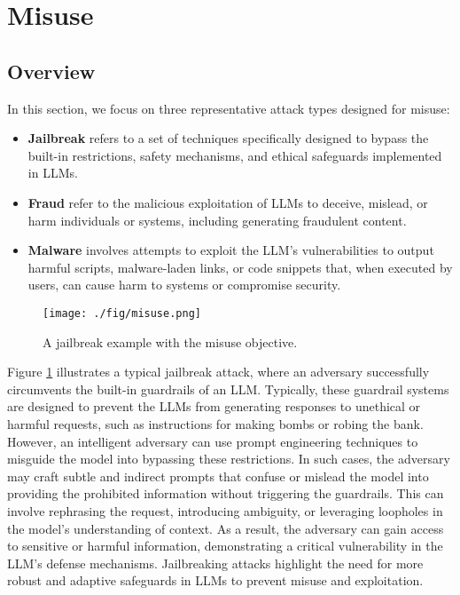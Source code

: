 \section{Misuse} \label{sec:misuse}
\subsection{Overview}

In this section, we focus on three representative attack types designed for misuse:
\begin{itemize}
    \item{\bf Jailbreak} refers to a set of techniques specifically designed to bypass the built-in restrictions, safety mechanisms, and ethical safeguards implemented in LLMs.

    \item{\bf Fraud} refer to the malicious exploitation of LLMs to deceive, mislead, or harm individuals or systems, including generating fraudulent content.

    \item{\bf Malware} involves attempts to exploit the LLM's vulnerabilities to output harmful scripts, malware-laden links, or code snippets that, when executed by users, can cause harm to systems or compromise security.
\end{itemize}

\begin{figure}[h]
	\centering
	\texttt{[image: ./fig/misuse.png]}
	\caption{A jailbreak example with the misuse objective.}
	\label{fig:misuse}
\end{figure}

Figure \ref{fig:misuse} illustrates a typical jailbreak attack, where an adversary successfully circumvents the built-in guardrails of an LLM. Typically, these guardrail systems are designed to prevent the LLMs from generating responses to unethical or harmful requests, such as instructions for making bombs or robing the bank. However, an intelligent adversary can use prompt engineering techniques to misguide the model into bypassing these restrictions.
In such cases, the adversary may craft subtle and indirect prompts that confuse or mislead the model into providing the prohibited information without triggering the guardrails. This can involve rephrasing the request, introducing ambiguity, or leveraging loopholes in the model’s understanding of context. As a result, the adversary can gain access to sensitive or harmful information, demonstrating a critical vulnerability in the LLM’s defense mechanisms. Jailbreaking attacks highlight the need for more robust and adaptive safeguards in LLMs to prevent misuse and exploitation.

